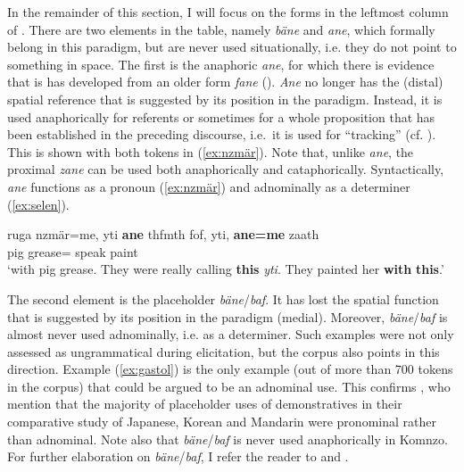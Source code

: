 \documentclass[output=paper,colorlinks,citecolor=brown]{langscibook}
\begin{document}
In the remainder of this section, I will focus on the forms in the leftmost column of . There are two elements in the table, namely \textit{bäne} and \textit{ane}, which formally belong in this paradigm, but are never used situationally, i.e. they do not point to something in space. The first is the anaphoric \textit{ane}, for which there is evidence that is has developed from an older form \textit{fane} (\cite[110ff.]{Dohler:2018qt}). \textit{Ane} no longer has the (distal) spatial reference that is suggested by its position in the paradigm. Instead, it is used anaphorically for referents or sometimes for a whole proposition that has been established in the preceding discourse, i.e.\ it is used for ``tracking'' (cf. \cite{Himmelmann:1996sn}). This is shown with both tokens in (\ref{ex:nzmär}). Note that, unlike \textit{ane}, the proximal \textit{zane} can be used both anaphorically and cataphorically. Syntactically, \textit{ane} functions as a pronoun (\ref{ex:nzmär}) and adnominally as a determiner (\ref{ex:selen}).

\ea \label{ex:nzmär}
    \gll ruga nzmär=me, yti \textbf{ane} thfmth fof, yti, \textbf{ane=me} zaath\\
    pig grease=   speak    paint\\
    \glt `with pig grease. They were really calling \textbf{this} \textit{yti}. They painted her \textbf{with} \textbf{this}.' 
\z

The second element is the placeholder \textit{bäne}/\textit{baf}. It has lost the spatial function that is suggested by its position in the paradigm (medial). Moreover, \textit{bäne}/\textit{baf} is almost never used adnominally, i.e. as a determiner. Such examples were not only assessed as ungrammatical during elicitation, but the corpus also points in this direction. Example (\ref{ex:gastol}) is the only example (out of more than 700 tokens in the corpus) that could be argued to be an adnominal use. This confirms \textcite{Hayashi:2010xh}, who mention that the majority of placeholder uses of demonstratives in their comparative study of Japanese, Korean and Mandarin were pronominal rather than adnominal. Note also that \textit{bäne}/\textit{baf} is never used anaphorically in Komnzo. For further elaboration on \textit{bäne}/\textit{baf}, I refer the reader to  and .
\end{document}

